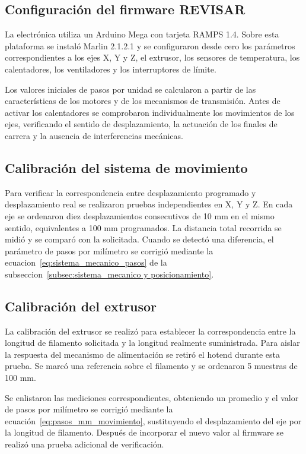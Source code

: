 \subsection{Configuración del firmware REVISAR}
La electrónica utiliza un Arduino Mega con tarjeta RAMPS 1.4. Sobre esta plataforma se instaló Marlin 2.1.2.1 \cite{marlin_firmware} y se configuraron desde cero los parámetros correspondientes a los ejes X, Y y Z, el extrusor, los sensores de temperatura, los calentadores, los ventiladores y los interruptores de límite.

Los valores iniciales de pasos por unidad se calcularon a partir de las características de los motores y de los mecanismos de transmisión. Antes de activar los calentadores se comprobaron individualmente los movimientos de los ejes, verificando el sentido de desplazamiento, la actuación de los finales de carrera y la ausencia de interferencias mecánicas.

\subsection{Calibración del sistema de movimiento}
\label{sec:calibracion_del_sistema_de_movimiento}

Para verificar la correspondencia entre desplazamiento programado y desplazamiento real se realizaron pruebas independientes en X, Y y Z. En cada eje se ordenaron diez desplazamientos consecutivos de 10 mm en el mismo sentido, equivalentes a 100 mm programados. La distancia total recorrida se midió y se comparó con la solicitada.
Cuando se detectó una diferencia, el parámetro de pasos por milímetro se corrigió mediante la ecuacion~\ref{eq:sistema_mecanico_pasos} de la subseccion~\ref{subsec:sistema_mecanico y posicionamiento}.



\subsection{Calibración del extrusor}
\label{sec:calibracion_extrusor}
La calibración del extrusor se realizó para establecer la correspondencia entre la longitud de filamento solicitada y la longitud realmente suministrada. Para aislar la respuesta del mecanismo de alimentación se retiró el hotend durante esta prueba. Se marcó una referencia sobre el filamento y se ordenaron 5 muestras de 100 mm.

Se enlistaron las mediciones correspondientes, obteniendo un promedio y el valor de pasos por milímetro se corrigió mediante la ecuación~\ref{eq:pasos_mm_movimiento}, sustituyendo el desplazamiento del eje por la longitud de filamento. Después de incorporar el nuevo valor al firmware se realizó una prueba adicional de verificación.

